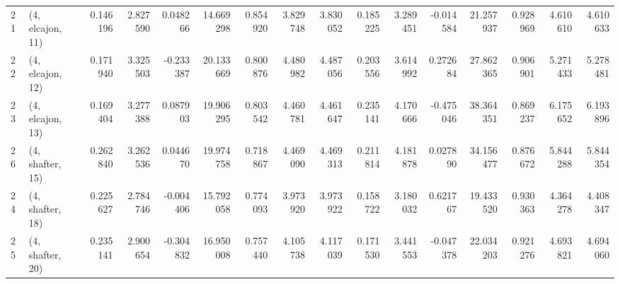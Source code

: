 \begin{tabular}{llrrrrrrrrrrrrrr}
21 &  (4, elcajon, 11) &   0.146196 &  2.827590 &  0.048266 &  14.669298 &  0.854920 &   3.829748 &  3.830052 &  0.185225 &  3.289451 & -0.014584 &   21.257937 &  0.928969 &   4.610610 &   4.610633 \\
22 &  (4, elcajon, 12) &   0.171940 &  3.325503 & -0.233387 &  20.133669 &  0.800876 &   4.480982 &  4.487056 &  0.203556 &  3.614992 &  0.272684 &   27.862365 &  0.906901 &   5.271433 &   5.278481 \\
23 &  (4, elcajon, 13) &   0.169404 &  3.277388 &  0.087903 &  19.906295 &  0.803542 &   4.460781 &  4.461647 &  0.235141 &  4.170666 & -0.475046 &   38.364351 &  0.869237 &   6.175652 &   6.193896 \\
26 &  (4, shafter, 15) &   0.262840 &  3.262536 &  0.044670 &  19.974758 &  0.718867 &   4.469090 &  4.469313 &  0.211814 &  4.181878 &  0.027890 &   34.156477 &  0.876672 &   5.844288 &   5.844354 \\
24 &  (4, shafter, 18) &   0.225627 &  2.784746 & -0.004406 &  15.792058 &  0.774093 &   3.973920 &  3.973922 &  0.158722 &  3.180032 &  0.621767 &   19.433520 &  0.930363 &   4.364278 &   4.408347 \\
25 &  (4, shafter, 20) &   0.235141 &  2.900654 & -0.304832 &  16.950008 &  0.757440 &   4.105738 &  4.117039 &  0.171530 &  3.441553 & -0.047378 &   22.034203 &  0.921276 &   4.693821 &   4.694060 \\
\bottomrule
\end{tabular}
